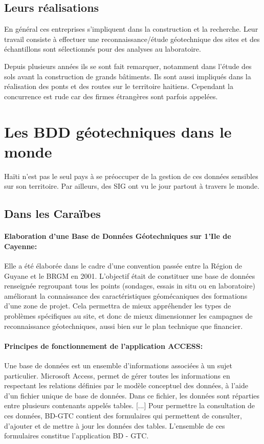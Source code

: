         
        \subsection{Leurs réalisations}
        En général ces entreprises s'impliquent dans la construction et la recherche. 
        Leur travail consiste à effectuer une reconnaissance/étude géotechnique des sites et des échantillons  sont sélectionnés pour des analyses au
        laboratoire.
        \par
        Depuis plusieurs années ils se sont fait remarquer, notamment dans
         l'étude des sols avant la construction de grands bâtiments. Ils sont aussi impliqués dans la réalisation des ponts et des routes sur le territoire
          haitiens. Cependant la concurrence est rude car des firmes étrangères sont parfois appelées. 
        \section{Les BDD géotechniques dans le monde}
        Haïti n’est pas le seul pays à se préoccuper de la gestion de ces données sensibles sur son territoire. Par ailleurs, des SIG ont vu le jour partout à travers le monde.
        \subsection{Dans les Caraïbes}
        \paragraph{Elaboration d'une Base de Données Géotechniques
        sur 1'Ile de Cayenne: }
        Elle a été élaborée dans le cadre d'une convention passée entre la
        Région de Guyane et le BRGM en 2001.
        \cite{Cayenne}
         L'objectif était de constituer une base de données renseignée regroupant tous les points (sondages, essais
        in situ ou en laboratoire) améliorant la connaissance des caractéristiques géomécaniques des
        formations d'une zone de projet. Cela permettra de mieux appréhender les types de problèmes
        spécifiques au site, et donc de mieux dimensionner les campagnes de reconnaissance
        géotechniques, aussi bien sur le plan technique que financier.
       \paragraph{ Principes de fonctionnement de l'application ACCESS: }
       Une base de données est un ensemble d'informations associées à un sujet particulier.
        Microsoft Access, permet de gérer toutes les informations en respectant les relations définies
        par le modèle conceptuel des données, à l'aide d'un fichier unique de base de données. Dans
        ce fichier, les données sont réparties entre plusieurs contenants appelés tables. [...]
        Pour permettre la consultation de ces données, BD-GTC contient des formulaires qui
        permettent de consulter, d'ajouter et de mettre à jour les données des tables. L'ensemble de ces
        formulaires constitue l'application BD - GTC.
        \cite{Cayenne}


